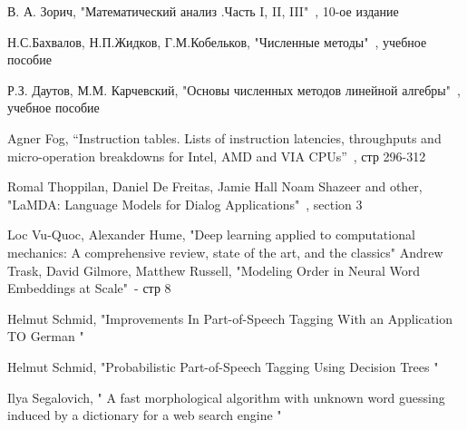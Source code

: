 \documentclass[12pt]{extarticle}
\begin{document}
\begin{thebibliography}{}
     В. А. Зорич, "Математический анализ .Часть I, II, III"\ , 10-ое издание

      Н.С.Бахвалов, Н.П.Жидков, Г.М.Кобельков,
"Численные методы"\ , учебное пособие

     Р.З. Даутов, М.М. Карчевский, "Основы численных методов линейной алгебры"\ , учебное пособие
    
     Agner Fog, “Instruction tables. Lists of instruction latencies, throughputs and micro-operation breakdowns for Intel, AMD and VIA CPUs”\ , стр 296-312 \newline
    
     Romal Thoppilan, Daniel De Freitas, Jamie Hall Noam Shazeer and other,   "LaMDA: Language Models for Dialog Applications"\ , section 3
    
     Loc Vu-Quoc, Alexander Hume, "Deep learning applied to computational mechanics: A comprehensive review, state of the art, and the classics"
     Andrew Trask, David Gilmore, Matthew Russell, "Modeling Order in Neural Word Embeddings at Scale"\ - стр 8
    
     Helmut Schmid, "Improvements In Part-of-Speech Tagging With an Application TO German "\
    
     Helmut Schmid, "Probabilistic Part-of-Speech Tagging Using Decision Trees "\
    
    Ilya Segalovich, " A fast morphological algorithm with unknown word guessing induced by a dictionary for a web search engine "\

\end{thebibliography}
\end{document}
